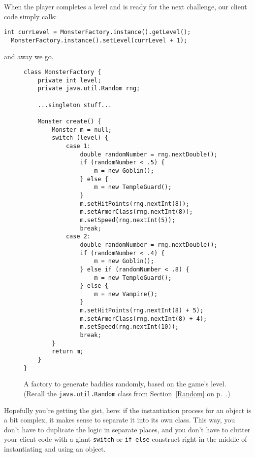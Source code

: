 When the player completes a level and is ready for the next challenge, our
client code simply calls:

\begin{Verbatim}[fontsize=\small,samepage=true,frame=none]
  int currLevel = MonsterFactory.instance().getLevel();
  MonsterFactory.instance().setLevel(currLevel + 1);
\end{Verbatim}

and away we go.

\begin{figure}
\begin{Verbatim}[fontsize=\footnotesize,samepage=true,frame=single]
class MonsterFactory {
    private int level;
    private java.util.Random rng;
    
    ...singleton stuff...

    Monster create() {
        Monster m = null;
        switch (level) {
            case 1:
                double randomNumber = rng.nextDouble();
                if (randomNumber < .5) {
                    m = new Goblin();
                } else {
                    m = new TempleGuard();
                }
                m.setHitPoints(rng.nextInt(8));
                m.setArmorClass(rng.nextInt(8));
                m.setSpeed(rng.nextInt(5));
                break;
            case 2:
                double randomNumber = rng.nextDouble();
                if (randomNumber < .4) {
                    m = new Goblin();
                } else if (randomNumber < .8) {
                    m = new TempleGuard();
                } else {
                    m = new Vampire();
                }
                m.setHitPoints(rng.nextInt(8) + 5);
                m.setArmorClass(rng.nextInt(8) + 4);
                m.setSpeed(rng.nextInt(10));
                break;
        }
        return m;
    }
}
\end{Verbatim}
\caption{A factory to generate baddies randomly, based on the game's level.
(Recall the \texttt{java.util.Random} class from Section~\ref{Random} on
p.~\pageref{Random}.)}
\label{fig:monsterFactoryCode}
\end{figure}

Hopefully you're getting the gist, here: if the instantiation process for an
object is a bit complex, it makes sense to separate it into its own class.
This way, you don't have to duplicate the logic in separate places, and you
don't have to clutter your client code with a giant \texttt{switch} or
\texttt{if-else} construct right in the middle of instantiating and using an
object.

